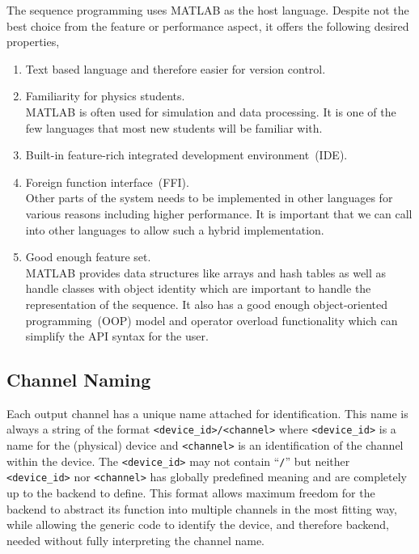 The sequence programming uses MATLAB as the host language.
Despite not the best choice from the feature or performance aspect,
it offers the following desired properties,
\begin{enumerate}
\item Text based language and therefore easier for version control.
\item Familiarity for physics students.\\
  MATLAB is often used for simulation and data processing.
  It is one of the few languages that most new students will be familiar with.
\item Built-in feature-rich integrated development environment~(IDE).
\item Foreign function interface~(FFI).\\
  Other parts of the system needs to be implemented in other languages
  for various reasons including higher performance.
  It is important that we can call into other languages to allow such a hybrid implementation.
\item Good enough feature set.\\
  MATLAB provides data structures like arrays and hash tables
  as well as handle classes with object identity
  which are important to handle the representation of the sequence.
  It also has a good enough object-oriented programming~(OOP) model
  and operator overload functionality which can simplify the API syntax for the user.
\end{enumerate}

\subsection{Channel Naming}
\label{ch:computer-control:frontend:channel}
Each output channel has a unique name attached for identification.
This name is always a string of the format \verb`<device_id>/<channel>`
where \verb`<device_id>` is a name for the (physical) device
and \verb`<channel>` is an identification of the channel within the device.
The \verb`<device_id>` may not contain ``\verb`/`'' but
neither \verb`<device_id>` nor \verb`<channel>` has globally predefined meaning
and are completely up to the backend to define.
This format allows maximum freedom for the backend to abstract its function
into multiple channels in the most fitting way,
while allowing the generic code to identify the device, and therefore backend,
needed without fully interpreting the channel name.


